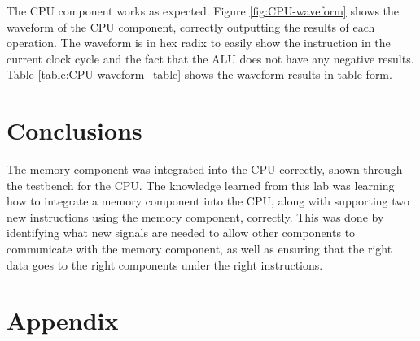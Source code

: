 \documentclass[11pt]{report}
\begin{document}
The CPU component works as expected. Figure \ref{fig:CPU-waveform} shows the waveform of the CPU
component, correctly outputting the results of each operation. The waveform is in hex radix to
easily show the instruction in the current clock cycle and the fact that the ALU does not have any
negative results. Table \ref{table:CPU-waveform_table} shows the waveform results in table form.

\section*{Conclusions}
The memory component was integrated into the CPU correctly, shown through the testbench for the CPU.
The knowledge learned from this lab was learning how to integrate a memory component into the CPU,
along with supporting two new instructions using the memory component, correctly. This was done by
identifying what new signals are needed to allow other components to communicate with the memory
component, as well as ensuring that the right data goes to the right components under the right
instructions. 

% 
% 

\newpage

\section*{Appendix}



% 
% 
\end{document}

